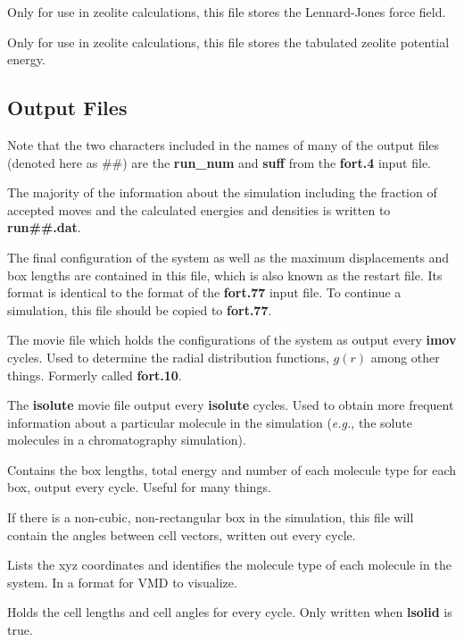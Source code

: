 \documentclass[12pt,letterpaper]{article}
\begin{document}
{{{{{{
Only for use in zeolite calculations, this file stores the Lennard-Jones force field.

Only for use in zeolite calculations, this file stores the tabulated zeolite potential energy.

\subsection{Output Files}
\label{output}

Note that the two characters included in the names of many of the output files (denoted here as \#\#)
are the {\bf run\_num} and {\bf suff} from the {\bf fort.4} input file.

 The majority of the information about the simulation including 
the fraction of accepted moves and the calculated energies and densities is written to {\bf run\#\#.dat}.  

The final configuration of the system as well as the maximum displacements and box lengths 
are contained in this file, which is also known as the restart file.  Its format is identical to the format of the
{\bf fort.77} input file.  To continue a simulation, this file should be copied to {\bf fort.77}.

The movie file which holds the configurations of the system as output
every {\bf imov} cycles.  Used to determine the radial distribution
functions, $g(r)$ among other things.  Formerly called {\bf fort.10}.

The {\bf isolute} movie file output every {\bf isolute} cycles.  
Used to obtain more frequent information about a particular molecule in the simulation 
({\it e.g.}, the solute molecules in a chromatography simulation).

Contains the box lengths, total energy and number of each molecule
type for each box, output every cycle.  Useful for many things.

If there is a non-cubic, non-rectangular box in the simulation, this
file will contain the angles between cell vectors, written out every
cycle.

 Lists the xyz coordinates and identifies the molecule type of each molecule
in the system.  In a format for VMD to visualize.

 Holds the cell lengths and cell angles for every cycle.  Only written when
{\bf lsolid} is true.

}}}}}}
\end{document}
